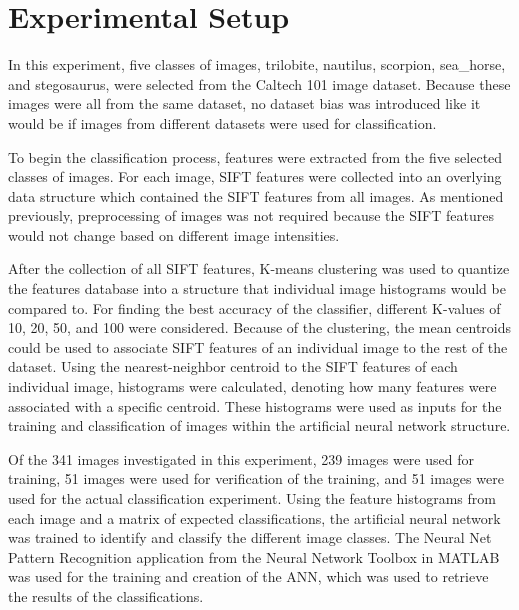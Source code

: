 \documentclass{article}
\begin{document}
\section{Experimental Setup}
\label{sec:expsetup}

In this experiment, five classes of images, trilobite, nautilus, scorpion, sea\_horse, and stegosaurus, were selected from the Caltech 101 image dataset\cite{LiFergusPerona04}. Because these images were all from the same dataset, no dataset bias was introduced like it would be if images from different datasets were used for classification. 

To begin the classification process, features were extracted from the five selected classes of images. For each image, SIFT features were collected into an overlying data structure which contained the SIFT features from all images. As mentioned previously, preprocessing of images was not required because the SIFT features would not change based on different image intensities.

After the collection of all SIFT features, K-means clustering was used to quantize the features database into a structure that individual image histograms would be compared to. For finding the best accuracy of the classifier, different K-values of 10, 20, 50, and 100 were considered. Because of the clustering, the mean centroids could be used to associate SIFT features of an individual image to the rest of the dataset. Using the nearest-neighbor centroid to the SIFT features of each individual image, histograms were calculated, denoting how many features were associated with a specific centroid. These histograms were used as inputs for the training and classification of images within the artificial neural network structure.

Of the 341 images investigated in this experiment, 239 images were used for training, 51 images were used for verification of the training, and 51 images were used for the actual classification experiment. Using the feature histograms from each image and a matrix of expected classifications, the artificial neural network was trained to identify and classify the different image classes. The Neural Net Pattern Recognition application from the Neural Network Toolbox in MATLAB was used for the training and creation of the ANN, which was used to retrieve the results of the classifications.

%
\end{document}
